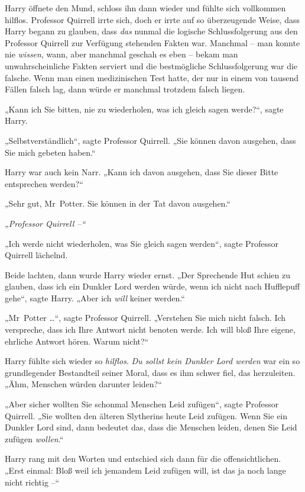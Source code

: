 {Harry öffnete den Mund, schloss ihn dann wieder und fühlte sich vollkommen hilflos. Professor Quirrell irrte sich, doch er irrte auf so überzeugende Weise, dass Harry begann zu glauben, dass \emph{das} nunmal die logische Schlussfolgerung aus den Professor Quirrell zur Verfügung stehenden Fakten war. Manchmal -- man konnte nie \emph{wissen}, wann, aber manchmal geschah es eben -- bekam man unwahrscheinliche Fakten serviert und die bestmögliche Schlussfolgerung war die falsche. Wenn man einen medizinischen Test hatte, der nur in einem von tausend Fällen falsch lag, dann würde er manchmal trotzdem falsch liegen.

„Kann ich Sie bitten, nie zu wiederholen, was ich gleich sagen werde?“, sagte Harry.

„Selbstverständlich“, sagte Professor Quirrell. „Sie können davon ausgehen, dass Sie mich gebeten haben.“

Harry war auch kein Narr. „Kann ich davon ausgehen, dass Sie dieser Bitte entsprechen werden?“

„Sehr gut, Mr~Potter. Sie können in der Tat davon ausgehen.“

\emph{„Professor Quirrell --“}

„Ich werde nicht wiederholen, was Sie gleich sagen werden“, sagte Professor Quirrell lächelnd.

Beide lachten, dann wurde Harry wieder ernst. „Der Sprechende Hut schien zu glauben, dass ich ein Dunkler Lord werden würde, wenn ich nicht nach Hufflepuff gehe“, sagte Harry. „Aber ich \emph{will} keiner werden.“

„Mr~Potter …“, sagte Professor Quirrell. „Verstehen Sie mich nicht falsch. Ich verspreche, dass ich Ihre Antwort nicht benoten werde. Ich will bloß Ihre eigene, ehrliche Antwort hören. Warum nicht?“

Harry fühlte sich wieder so \emph{hilflos}. \emph{Du sollst kein Dunkler Lord werden} war ein so grundlegender Bestandteil seiner Moral, dass es ihm schwer fiel, das herzuleiten. „Ähm, Menschen würden darunter leiden?“

„Aber sicher wollten Sie schonmal Menschen Leid zufügen“, sagte Professor Quirrell. „Sie wollten den älteren Slytherins heute Leid zufügen. Wenn Sie ein Dunkler Lord sind, dann bedeutet das, dass die Menschen leiden, denen Sie Leid zufügen \emph{wollen}.“

Harry rang mit den Worten und entschied sich dann für die offensichtlichen. „Erst einmal: Bloß weil ich jemandem Leid zufügen will, ist das ja noch lange nicht richtig --“

}
